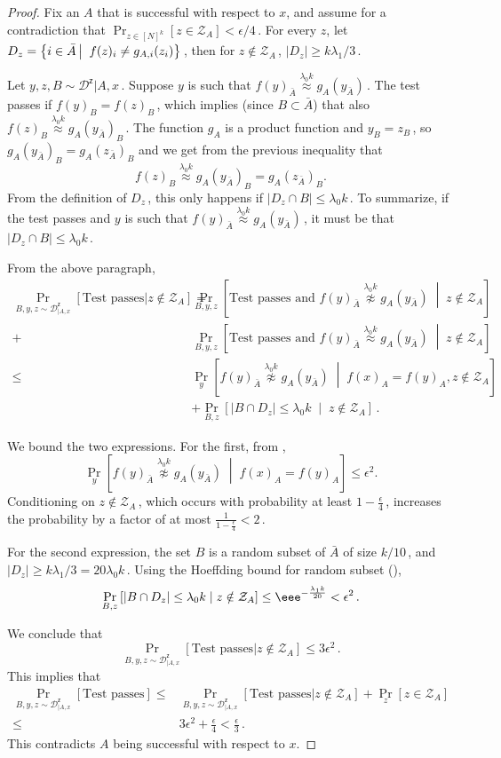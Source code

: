 \documentclass{toc}
\newcommand{\Prob}[2][]{\Pr_{{#1}}\left[#2\right]} %
\newcommand{\abs}[1]{\lvert#1\rvert} %
\newcommand{\given}{\;\middle\vert\;} %
\newcommand\sett[2]{\left\{ #1 \left| \; \vphantom{#1 #2} \right. #2  \right\}} %
\newcommand\f{f} %
\newcommand{\g}{g} %
\newcommand\neql[1]{\stackrel{{#1}}{ \approx}} %
\newcommand\neqg[1]{\stackrel{{#1}}{ \not\approx}} %
\newcommand\rest[1]{{\bar{#1}}}  %
\newcommand\zi{\mathcal{Z}} %
\newcommand{\D}{\mathcal{D}^{\mathsf{z}}} %
\begin{document}
\begin{proof}
	Fix an $A$ that is successful with respect to $x$, and assume 
%
for a  %
contradiction that  $\Prob[{z\in[N]^k}]{z\in \zi_A}<
%
\epsilon/4$\,. %
    For every $z$, let $D_z = \sett{i\in\rest{A}}{\f(z)_i\neq \g_{A,i}(z_i)}$\,, then for $z\notin\zi_A$\,, $\abs{D_z}\geq 
	k\lambda_1/3$\,. %
	
	Let $y,z,B\sim \D|A,x$\,. Suppose $y$ is such that $\f(y)_{\rest{A}} \neql{\lambda_0 k} \g_A(y_{\rest{A}})$\,. The test passes if $\f(y)_B = \f(z)_B$\,, which implies (since $B\subset \bar A$) that also $\f(z)_B\neql{\lambda_0 k} \g_A(y_{\rest{A}})_B$\,. The function $\g_A$ is a product function and $y_B=z_B$\,, so $\g_A(y_\rest{A})_B= \g_A(z_\rest{A})_B$ and we get from the previous inequality that 
	\[\f(z)_B\neql{\lambda_0 k}   \g_A(y_\rest{A})_B= \g_A(z_\rest{A})_B.\] From the definition of $D_z$\,, this only happens if $\abs{D_z\cap B}\leq \lambda_0 k$\,. To summarize, if the test passes and $y$ is such that $\f(y)_{\rest{A}} \neql{\lambda_0 k} \g_A(y_{\rest{A}})$\,, it must be that $\abs{D_z\cap B}\leq \lambda_0 k$\,.
		

	From the above paragraph,
	\begin{align*}
	\Pr_{B,y,z\sim \D_{|A,x}}[\text{Test passes}| z\notin \zi_A] =&
	\Prob[B,y,z]{\text{Test passes and } \f(y)_{\rest{A}} \neqg{\lambda_0 k} \g_A(y_{\rest{A}})\given z\notin \zi_A}\\
	+& \Prob[B,y,z]{\text{Test passes and } \f(y)_{\rest{A}} \neql{\lambda_0 k} \g_A(y_{\rest{A}})\given z\notin \zi_A} \\\leq&
	\Prob[y]{\f(y)_{\rest{A}} \neqg{\lambda_0 k} \g_A(y_{\rest{A}})\given \f(x)_A = \f(y)_A,z\notin \zi_A}\\
&+\Prob[B,z]{\abs{B\cap D_z}\leq \lambda_0 k \given z\notin \zi_A}\,. %
	\end{align*}
	
	We bound the two expressions. For the first, from , 
	\[ \Prob[y]{\f(y)_{\rest{A}} \neqg{\lambda_0 k} \g_A(y_{\rest{A}})\given \f(x)_A = \f(y)_A} \leq\epsilon^2. \]
	Conditioning on $z\notin \zi_A$\,, which occurs with probability at least $1-\frac{\epsilon}{4}$\,, increases the probability by a factor of at most $\frac{1}{1-\frac{\epsilon}{4}}<2$\,.
	
	For the second expression, the set $B$ is a random subset of $\rest{A}$ of size $k/10$\,, and $\abs{D_z}\geq 
	k\lambda_1/3 %
	= 20\lambda_0 k$\,. Using
the  %
%
%
%
Hoeffding bound for random subset  %
(),
	\[ \Prob[B,z]{\abs{B\cap D_z}\leq \lambda_0 k \given z\notin \zi_A} \leq  \eee^{-\frac{\lambda_1 k}{20}} < \epsilon^2\,. \]%

	We conclude that
	\[ \Pr_{B,y,z\sim \D_{|A,x}}[\text{Test passes}| z\notin \zi_A] \leq 3\epsilon^2\,. \]%
	This implies that
	\begin{align*}
		\Pr_{B,y,z\sim \D_{|A,x}}[\text{Test passes}] \leq& \Pr_{B,y,z\sim \D_{|A,x}}[\text{Test passes}| z\notin \zi_A] + \Pr_z[z\in\zi_A]\\
		\leq& 3\epsilon^2 + \frac{\epsilon}{4} < \frac{\epsilon}{3}\,.%
	\end{align*}
    This contradicts $A$ being successful with respect to $x$.
\end{proof}
\end{document}
